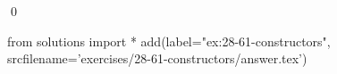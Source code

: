 
\begin{ex}
  \label{ex:28-61-constructors}
  
  \qed
\end{ex}
\begin{python0}
from solutions import *
add(label="ex:28-61-constructors",
    srcfilename='exercises/28-61-constructors/answer.tex')
\end{python0}

